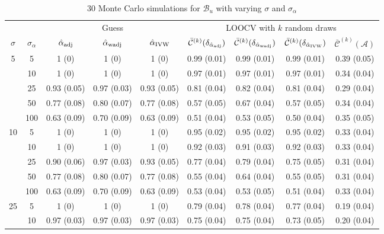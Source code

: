 \documentclass[11pt]{article}
\def\mc#1{\mathcal{#1}} %
\theoremstyle{definition}
\begin{document}
\begin{table}[H]
\caption{30 Monte Carlo simulations  for $\mc{B}_u$ with varying $\sigma$ and $\sigma_{\alpha}$} \label{table7}
\begin{center}
\begin{tabular}{cc|ccc|cccc}
   &   & \multicolumn{3}{|c|}{Guess} & \multicolumn{4}{|c}{LOOCV with $k$ random draws}  \\ 
 $\sigma$   & $\sigma_{\alpha}$ &  $\hat{\alpha}_{\rm adj}$  & $\hat{\alpha}_{\rm wadj}$ & $\hat{\alpha}_{\rm IVW}$  & $\bar{\mc{C}}^{(k)}(\delta_{\hat{\alpha}_{\rm adj}})$  & $\bar{\mc{C}}^{(k)}(\delta_{\hat{\alpha}_{\rm wadj}})$ & $\bar{\mc{C}}^{(k)}(\delta_{\hat{\alpha}_{\rm IVW}})$ &  $\bar{\mc{C}}^{(k)}(\mc{A})$ \\[.3cm]  
  \hline
 \multirow{5}{*}{5} & 5  & 1 (0) & 1 (0) & 1 (0) & 0.99 (0.01) & 0.99 (0.01) & 0.99 (0.01) & 0.39 (0.05) \\ 
    & 10  & 1 (0) & 1 (0) & 1 (0) & 0.97 (0.01) & 0.97 (0.01) & 0.97 (0.01) & 0.34 (0.04) \\ 
    & 25  & 0.93 (0.05) & 0.97 (0.03) & 0.93 (0.05) & 0.81 (0.04) & 0.82 (0.04) & 0.81 (0.04) & 0.29 (0.04) \\ 
    & 50  & 0.77 (0.08) & 0.80 (0.07) & 0.77 (0.08) & 0.57 (0.05) & 0.67 (0.04) & 0.57 (0.05) & 0.34 (0.04) \\ 
    & 100  & 0.63 (0.09) & 0.70 (0.09) & 0.63 (0.09) & 0.51 (0.04) & 0.53 (0.05) & 0.50 (0.04) & 0.35 (0.05) \\[.3cm] 
   \multirow{5}{*}{10} & 5  & 1 (0) & 1 (0) & 1 (0) & 0.95 (0.02) & 0.95 (0.02) & 0.95 (0.02) & 0.33 (0.04) \\ 
    & 10  & 1 (0) & 1 (0) & 1 (0) & 0.92 (0.03) & 0.91 (0.03) & 0.92 (0.03) & 0.33 (0.04) \\ 
    & 25  & 0.90 (0.06) & 0.97 (0.03) & 0.93 (0.05) & 0.77 (0.04) & 0.79 (0.04) & 0.75 (0.05) & 0.31 (0.04) \\ 
    & 50  & 0.77 (0.08) & 0.80 (0.07) & 0.77 (0.08) & 0.55 (0.04) & 0.64 (0.04) & 0.55 (0.05) & 0.31 (0.04) \\ 
    & 100  & 0.63 (0.09) & 0.70 (0.09) & 0.63 (0.09) & 0.53 (0.04) & 0.53 (0.05) & 0.51 (0.04) & 0.33 (0.04) \\[.3cm] 
   \multirow{5}{*}{25}  & 5  & 1 (0) & 1 (0) & 1 (0) & 0.79 (0.04) & 0.78 (0.04) & 0.77 (0.04) & 0.19 (0.04) \\ 
    & 10  & 0.97 (0.03) & 0.97 (0.03) & 0.97 (0.03) & 0.75 (0.04) & 0.75 (0.04) & 0.73 (0.05) & 0.20 (0.04) \\ 

\end{tabular}
\end{center}
\end{table}
\end{document}

